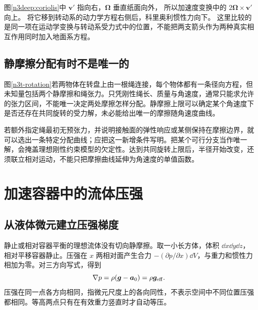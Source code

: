 图\ref{n3deep:coriolis}中 $\bm v'$ 指向右，$\bm\Omega$ 垂直纸面向外，
所以加速度变换中的 $2\bm\Omega\times\bm v'$ 向上。
将它移到转动系的动力学方程右侧后，科里奥利惯性力向下。
这里比较的是同一项在运动学变换与转动系受力式中的位置，不能把两支箭头作为两种真实相互作用同时加入地面系方程。

\subsection{静摩擦分配有时不是唯一的}
图\ref{n3t-rotation}若两物体在转盘上由一根绳连接，每个物体都有一条径向方程，但未知量包括两个静摩擦和绳张力。只凭刚性绳长、质量与角速度，通常只能求允许的张力区间，不能唯一决定两处摩擦怎样分配。静摩擦上限可以确定某个角速度下是否还存在共同旋转的受力解，未必能给出唯一的摩擦随角速度曲线。

若额外指定绳最初无预张力，并说明接触面的弹性响应或某侧保持在摩擦边界，就可以选出一条特定分配曲线；应把这一新增条件写明。把某个可行分支当作唯一解，会掩盖理想刚性约束模型的欠定性。达到共同旋转上限后，半径开始改变，还须联立相对运动，不能只把摩擦曲线延伸为角速度的单值函数。

\section{加速容器中的流体压强}
\subsection{从液体微元建立压强梯度}
静止或相对容器平衡的理想流体没有切向静摩擦。取一小长方体，体积 $\dd x\dd y\dd z$，相对平移容器静止。压强在 $x$ 两相对面产生合力 $-(\partial p/\partial x)\dd V$，与重力和惯性力相加为零。对三方向写式，得到
\begin{equation}\label{n3eq-pressure}
\nabla p=\rho(\bm g-\bm a_0)=\rho\bm g_{\rm eff}.
\end{equation}
压强在同一点各方向相同，指微元尺度上的各向同性，不表示空间中不同位置压强都相同。等高两点只有在有效重力竖直时才自动等压。

